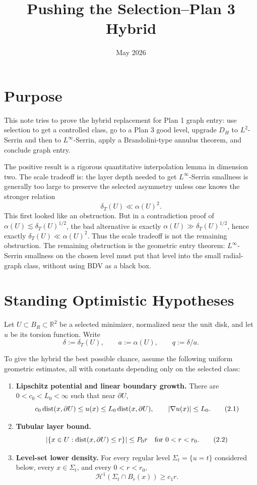 \documentclass[11pt]{article}
\title{Pushing the Selection--Plan 3 Hybrid}
\author{}
\date{May 2026}
\newcommand{\dT}{\delta_T}
\newcommand{\al}{\alpha}
\begin{document}
\maketitle

\section{Purpose}

This note tries to prove the hybrid replacement for Plan 1 graph entry:
use selection to get a controlled class, go to a Plan 3 good level, upgrade
\(D_H\) to \(L^2\)-Serrin and then to \(L^\infty\)-Serrin, apply a
Brandolini-type annulus theorem, and conclude graph entry.

The positive result is a rigorous quantitative interpolation lemma in
dimension two.  The scale tradeoff is:
the layer depth needed to get \(L^\infty\)-Serrin smallness is generally too
large to preserve the selected asymmetry unless one knows the stronger
relation
\[
   \dT(U)\ll \al(U)^2.
\]
This first looked like an obstruction.  But in a contradiction proof of
\(\al(U)\lesssim \dT(U)^{1/2}\), the bad alternative is exactly
\(\al(U)\gg \dT(U)^{1/2}\), hence exactly \(\dT(U)\ll\al(U)^2\).  Thus the
scale tradeoff is not the remaining obstruction.  The remaining obstruction
is the geometric entry theorem: \(L^\infty\)-Serrin smallness on the chosen
level must put that level into the small radial-graph class, without using
BDV as a black box.

\section{Standing Optimistic Hypotheses}

Let \(U\subset B_R\subset\mathbb R^2\) be a selected minimizer, normalized
near the unit disk, and let \(u\) be its torsion function.  Write
\[
   \delta:=\dT(U),\qquad a:=\al(U),\qquad q:=\delta/a.
\]

To give the hybrid the best possible chance, assume the following uniform
geometric estimates, all with constants depending only on the selected class:

\begin{enumerate}[label=(H\arabic*)]
\item \textbf{Lipschitz potential and linear boundary growth.}
There are \(0<c_0<L_0<\infty\) such that near \(\partial U\),
\[
   c_0\,{\rm dist}(x,\partial U)\le u(x)\le
   L_0\,{\rm dist}(x,\partial U),
   \qquad
   |\nabla u(x)|\le L_0.
   \tag{2.1}\label{eq:growth}
\]
\item \textbf{Tubular layer bound.}
\[
   |\{x\in U:{\rm dist}(x,\partial U)\le r\}|
      \le P_0 r
   \quad\hbox{for }0<r<r_0.
   \tag{2.2}\label{eq:tube}
\]
\item \textbf{Level-set lower density.}
For every regular level \(\Sigma_t=\{u=t\}\) considered below, every
\(x\in\Sigma_t\), and every \(0<r<r_0\),
\[
   \mathcal H^1(\Sigma_t\cap B_r(x))\ge c_1 r.
   \tag{2.3}\label{eq:ahlfors}
\]
\end{enumerate}
\end{document}
